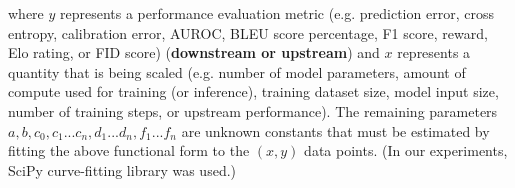 \documentclass{article} %
\begin{document}
\vspace{-1.0mm}

where $y$ represents a performance evaluation metric (e.g. prediction error, cross entropy, calibration error, AUROC, BLEU score percentage, F1 score, reward, Elo rating, or FID score) (\textbf{downstream or upstream}) and $x$ represents a quantity that is being scaled (e.g. number of model parameters, amount of compute used for training (or inference), training dataset size, model input size, number of training steps, or upstream performance). The remaining  parameters %
$a, b, c_0, c_1 ... c_n, d_1 ...  d_n, f_1 ... f_n$
are unknown constants that must be estimated by fitting the above functional form to the $(x,y)$ data points. (In our experiments,  SciPy curve-fitting library \citep{virtanen2020scipy} was used.) 

\clearpage


\end{document}
